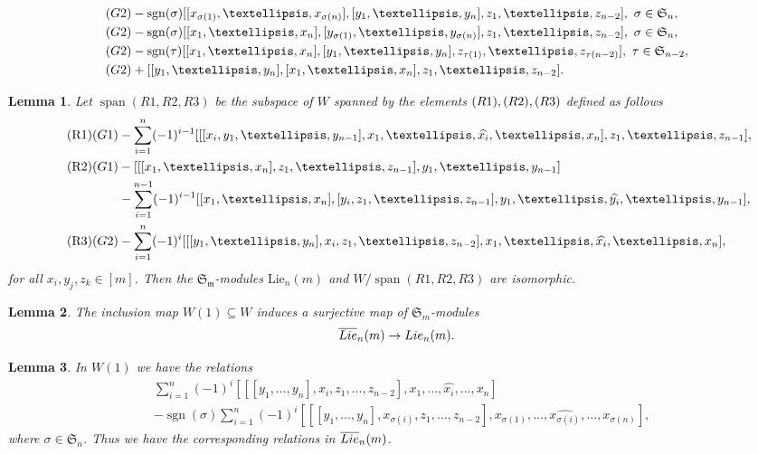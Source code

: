 \documentclass[10pt,a4paper]{amsart}
\newtheorem{lem}{Lemma}
\DeclareMathOperator{\sign}{sgn}
\DeclareMathOperator{\spn}{span}
\begin{document}
	\begin{align}
		\label{54}\textup{(G2)}&-\sign(\sigma)[[{x_{\sigma(1)}},\dots ,{x_{\sigma(n)}} ],[{y_{1}},\dots, y_{n}],  z_{1},\dots ,z_{n-2}  ],  \ \sigma \in \mathfrak{S}_n,
		\\\label{55}\textup{(G2)}&-\sign(\sigma)[[{x_1},\dots ,{x_n} ],[{y_{\sigma(1)}},\dots, y_{\sigma(n)}], z_{1},\dots ,z_{n-2}  ], \ \sigma \in \mathfrak{S}_n,\\
		\label{56}\textup{(G2)}&-\sign(\tau)[[{x_1},\dots ,{x_n} ],[{y_{1}},\dots, y_{n}], z_{\tau(1)},\dots ,z_{\tau(n-2)}  ], \ \tau \in \mathfrak{S}_{n-2},
		\\\label{57}\textup{(G2)}&+ [[{y_1},\dots ,{y_n} ],[{x_{1}},\dots, x_{n}], z_{1},\dots ,z_{n-2} ].
	\end{align}

\begin{lem}\label{genrel1}
	Let $\spn (R1,R2,R3)$ be the subspace of $W$ spanned by the elements $\textup{(R1), (R2), (R3)}$  defined as follows   \begin{align}\tag{R1} \textup{(G1)}&- \sum_{i=1}^{n}(-1)^{i-1}[[[x_i,{y_{1}},\dots, y_{n-1}],{x_1},\dots ,\widehat{x_i}, \dots, x_n ],z_{1},\dots ,z_{n-1}],\\
		\tag{R2} \textup{(G1)}&- [[[{x_1},\dots ,{x_n} ],{z_{1}},\dots, z_{n-1}], y_{1},\dots ,y_{n-1}]
		\\\nonumber&-\sum_{i=1}^{n-1}(-1)^{i-1}[[{x_1},\dots ,{x_{n}}],[y_{i},z_1, \dots, z_{n-1} ],{y_{1}},\dots, \widehat{y_i},\dots ,y_{n-1}],\\\tag{R3} \textup{(G2)}&-\sum_{i=1}^{n}(-1)^{i}[[[y_1,\dots,y_n],x_i , z_1,\dots, z_{n-2}],x_1,\dots,\widehat{x_i},\dots, x_n],
	\end{align}
for all $x_i, y_j, z_k \in [m]$. Then the $\mathfrak{S_m}$-modules  $\text{Lie}_n(m)$ and $W/\spn (R1,R2,R3)$ are isomorphic. 
\end{lem}

\begin{lem}\label{liebarsur} The inclusion map $W(1) \subseteq W$ induces a surjective map of $\mathfrak{S}_m$-modules \[\overline{\textup{Lie}}_n(m) \to \textup{Lie}_n(m).\]
\end{lem}

\begin{lem}\label{finalrel}
In $W(1)$  we have the relations 
\begin{align*}&\sum_{i=1}^n(-1)^i[[[y_1,\dots,y_n],x_i,z_1,\dots, z_{n-2}],x_1,\dots, \widehat{x_i}, \dots, x_n]\\&-\sign(\sigma)\sum_{i=1}^n(-1)^i[[[y_1,\dots,y_n],x_{\sigma(i)},z_1,\dots, z_{n-2}],x_{\sigma(1)},\dots, \widehat{x_{\sigma(i)}}, \dots, x_{\sigma(n)}],
\end{align*} where $\sigma \in \mathfrak{S}_n$. Thus we have the corresponding relations in $\overline{\textup{Lie}}_n(m)$.
\end{lem}
\end{document}
